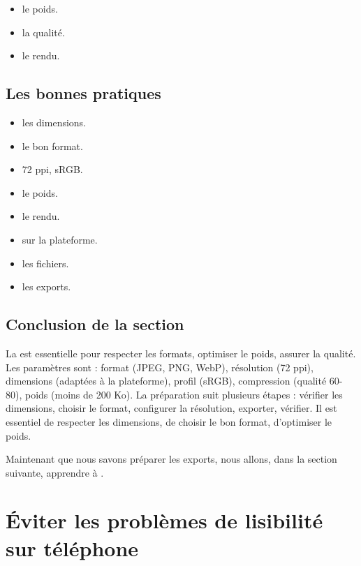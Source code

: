 \begin{itemize}
    \item {} le poids.
    \item {} la qualité.
    \item {} le rendu.
\end{itemize}

\subsection{Les bonnes pratiques}

\begin{itemize}
    \item {} les dimensions.
    \item {} le bon format.
    \item {} 72 ppi, sRGB.
    \item {} le poids.
    \item {} le rendu.
    \item {} sur la plateforme.
    \item {} les fichiers.
    \item {} les exports.
\end{itemize}

\subsection*{Conclusion de la section}

La  est essentielle pour respecter les formats, optimiser le poids, assurer la qualité. Les paramètres sont : format (JPEG, PNG, WebP), résolution (72 ppi), dimensions (adaptées à la plateforme), profil (sRGB), compression (qualité 60-80), poids (moins de 200 Ko). La préparation suit plusieurs étapes : vérifier les dimensions, choisir le format, configurer la résolution, exporter, vérifier. Il est essentiel de respecter les dimensions, de choisir le bon format, d'optimiser le poids.

Maintenant que nous savons préparer les exports, nous allons, dans la section suivante, apprendre à .

\section{Éviter les problèmes de lisibilité sur téléphone}

